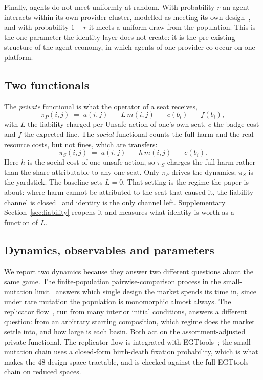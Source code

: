 \documentclass[preprint,12pt]{elsarticle}
\theoremstyle{plain}
\theoremstyle{definition}
\newcommand{\piP}{\pi_{P}}
\newcommand{\piS}{\pi_{S}}
\begin{document}
Finally, agents do not meet uniformly at random. With probability $r$ an agent
interacts within its own provider cluster, modelled as meeting its own
design~\citep{grafen1979hawk},
and with probability $1 - r$ it meets a uniform draw from the population. This
is the one parameter the identity layer does not create: it is the pre-existing
structure of the agent economy, in which agents of one provider co-occur on one
platform.

\subsection{Two functionals}
\label{sec:functionals}

The \emph{private} functional is what the operator of a seat receives,
\begin{equation}
\label{eq:private}
\piP(i, j) \;=\; a(i, j) \;-\; L\, m(i, j) \;-\; c(b_i) \;-\; f(b_i),
\end{equation}
with $L$ the liability charged per Unsafe action of one's own seat, $c$ the
badge cost and $f$ the expected fine. The \emph{social} functional counts the
full harm and the real resource costs, but not fines, which are transfers:
\begin{equation}
\label{eq:social}
\piS(i, j) \;=\; a(i, j) \;-\; h\, m(i, j) \;-\; c(b_i).
\end{equation}
Here $h$ is the social cost of one unsafe action, so $\piS$ charges the full
harm rather than the share attributable to any one seat.
Only $\piP$ drives the dynamics; $\piS$ is the yardstick. The baseline sets
$L = 0$. That setting is the regime the paper is about: where harm cannot be
attributed to the seat that caused it, the liability channel is
closed~\citep{chan2024visibility,kolt2025governing} and identity is the only
channel left. Supplementary Section~\ref{sec:liability} reopens it and measures what
identity is worth as a function of $L$.

\subsection{Dynamics, observables and parameters}
\label{sec:dynamics}

We report two dynamics because they answer two different questions about the
same game. The finite-population pairwise-comparison process in the
small-mutation limit~\citep{fudenberg2006imitation,traulsen2006stochastic}
answers which single design the market spends its time in, since under rare
mutation the population is monomorphic almost always. The replicator
flow~\citep{taylor1978ess,hofbauer1998evolutionary}, run from many interior
initial conditions, answers a different question: from an arbitrary starting
composition, which regime does the market settle into, and how large is each
basin. Both act on the assortment-adjusted private functional. The replicator
flow is integrated with EGTtools~\citep{domingos2023egttools}; the
small-mutation chain uses a closed-form birth-death fixation probability,
which is what makes the 48-design space tractable, and is checked against the
full EGTtools chain on reduced spaces.
\end{document}
